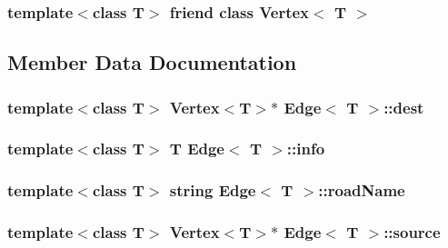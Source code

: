 \subsubsection[{\texorpdfstring{Vertex$<$ T $>$}{Vertex< T >}}]{\setlength{\rightskip}{0pt plus 5cm}template$<$class T$>$ friend class {\bf Vertex}$<$ T $>$\hspace{0.3cm}{\ttfamily [friend]}}\hypertarget{classEdge_a2e120a12dec663fa334633b4f26cbed8}{}\label{classEdge_a2e120a12dec663fa334633b4f26cbed8}


\subsection{Member Data Documentation}
\subsubsection[{\texorpdfstring{dest}{dest}}]{\setlength{\rightskip}{0pt plus 5cm}template$<$class T$>$ {\bf Vertex}$<$T$>$$\ast$ {\bf Edge}$<$ T $>$\+::dest\hspace{0.3cm}{\ttfamily [private]}}\hypertarget{classEdge_ae4d65678b91bd9d814af4720ad87cd0c}{}\label{classEdge_ae4d65678b91bd9d814af4720ad87cd0c}
\subsubsection[{\texorpdfstring{info}{info}}]{\setlength{\rightskip}{0pt plus 5cm}template$<$class T$>$ T {\bf Edge}$<$ T $>$\+::info\hspace{0.3cm}{\ttfamily [private]}}\hypertarget{classEdge_a3c76337d535f346456b825b3cbc88b14}{}\label{classEdge_a3c76337d535f346456b825b3cbc88b14}
\subsubsection[{\texorpdfstring{road\+Name}{roadName}}]{\setlength{\rightskip}{0pt plus 5cm}template$<$class T$>$ string {\bf Edge}$<$ T $>$\+::road\+Name\hspace{0.3cm}{\ttfamily [private]}}\hypertarget{classEdge_afaa271c93b0b5ac10547d196e3a6fad7}{}\label{classEdge_afaa271c93b0b5ac10547d196e3a6fad7}
\subsubsection[{\texorpdfstring{source}{source}}]{\setlength{\rightskip}{0pt plus 5cm}template$<$class T$>$ {\bf Vertex}$<$T$>$$\ast$ {\bf Edge}$<$ T $>$\+::source\hspace{0.3cm}{\ttfamily [private]}}\hypertarget{classEdge_aa6d3ef629128f4088d7520924ff4db9a}{}\label{classEdge_aa6d3ef629128f4088d7520924ff4db9a}

